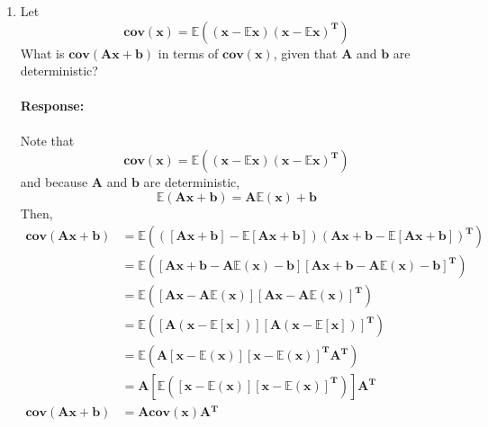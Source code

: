 \documentclass [11pt] {article}
\newcommand{\T}{\bf{T}}
\newcommand{\A}{\bf{A}}
\newcommand{\AT}{\bf{A$^{\T}$}}
\newcommand{\x}{\bf{x}}
\renewcommand{\b}{\bf{b}}
\newenvironment{response}{\begin{responseframe}\vspace{-10pt}\paragraph{Response:}}{\end{responseframe}}
\renewcommand{\bf}[1]{\textbf{{#1}}}
\begin{document}
\begin{enumerate}
\begin{enumerate}
            \item Let
                \[\bf{cov}(\x) = \mathbb{E}\left( \left( \x - \mathbb{E} \x \right) \left( \x - \mathbb{E} \x \right)^\T \right)\]
                What is $\bf{cov}(\A \x + \b)$ in terms of $\bf{cov}(\x)$, given that $\A$ and 
                $\b$ are deterministic?
                \begin{response}
                    \begin{small}
                        Note that 
                        \[\bf{cov}(\x) = \mathbb{E}\left( \left( \x - \mathbb{E} \x \right) \left( \x - \mathbb{E} \x \right)^\T \right)\]
                        and because $\A$ and $\b$ are deterministic,
                        \[\mathbb{E}(\A \x + \b) = \A \mathbb{E}(\x) + \b\]
                        Then,
                        \begin{align*}
                            \bf{cov}(\A \x + \b) &= \mathbb{E}\left( \left( [\A \x + \b] - \mathbb{E}[\A \x  + \b] \right) \left( \A \x + \b - \mathbb{E}[\A \x + \b] \right)^\T \right) \\
                                                 &= \mathbb{E}\left( \left[ \A \x + \b - \A \mathbb{E}(\x) - \b \right] \left[ \A \x + \b - \A \mathbb{E}(\x) - \b \right]^{\T} \right) \\
                                                 &= \mathbb{E}\left( \left[ \A \x - \A \mathbb{E}(\x) \right] \left[ \A \x - \A \mathbb{E}(\x) \right]^{\T} \right) \\
                                                 &= \mathbb{E}\left( \left[ \A \left( \x - \mathbb{E}[\x] \right) \right] \left[ \A \left( \x - \mathbb{E}[\x] \right) \right]^{\T} \right) \\
                                                 &= \mathbb{E}\left( \A \left[\x - \mathbb{E}(\x) \right] \left[\x - \mathbb{E}(\x) \right]^{\T} \AT \right) \\
                                                 &= \A \left[ \mathbb{E}\left( \left[\x - \mathbb{E}(\x) \right] \left[\x - \mathbb{E}(\x) \right]^{\T} \right) \right] \AT \\
                            \bf{cov}(\A \x + \b) &= \A \bf{cov}(\x) \AT 
                        \end{align*}
                    \end{small}
                \end{response}
        \end{enumerate}


\end{enumerate}
\end{document}
